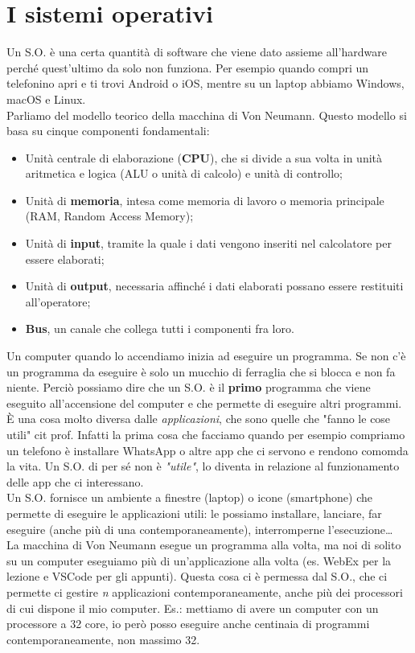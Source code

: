 \section{I sistemi operativi}
Un S.O. è una certa quantità di software che viene dato assieme all'hardware perché quest'ultimo da solo non funziona. Per esempio quando compri un telefonino apri e ti trovi Android o iOS, mentre su un laptop abbiamo Windows, macOS e Linux.\\ 
Parliamo del modello teorico della macchina di Von Neumann. Questo modello si basa su cinque componenti fondamentali:
\begin{itemize}
    \item Unità centrale di elaborazione (\textbf{CPU}), che si divide a sua volta in unità aritmetica e logica (ALU o unità di calcolo) e unità di controllo;
    \item Unità di \textbf{memoria}, intesa come memoria di lavoro o memoria principale (RAM, Random Access Memory);
    \item Unità di \textbf{input}, tramite la quale i dati vengono inseriti nel calcolatore per essere elaborati;
    \item Unità di \textbf{output}, necessaria affinché i dati elaborati possano essere restituiti all'operatore;
    \item \textbf{Bus}, un canale che collega tutti i componenti fra loro.
\end{itemize}
Un computer quando lo accendiamo inizia ad eseguire un programma. Se non c'è un programma da eseguire è solo un mucchio di ferraglia che si blocca e non fa niente. Perciò possiamo dire che un S.O. è il \textbf{primo} programma che viene eseguito all'accensione del computer e che permette di eseguire altri programmi. \`E una cosa molto diversa dalle \textit{applicazioni}, che sono quelle che "fanno le cose utili" cit prof. Infatti la prima cosa che facciamo quando per esempio compriamo un telefono è installare WhatsApp o altre app che ci servono e rendono comomda la vita. Un S.O. di per sé non è \textit{"utile"}, lo diventa in relazione al funzionamento delle app che ci interessano.\\
Un S.O. fornisce un ambiente a finestre (laptop) o icone (smartphone) che permette di eseguire le applicazioni utili: le possiamo installare, lanciare, far eseguire (anche più di una contemporaneamente), interromperne l'esecuzione\dots\\
La macchina di Von Neumann esegue un programma alla volta, ma noi di solito su un computer eseguiamo più di un'applicazione alla volta (es. WebEx per la lezione e VSCode per gli appunti). Questa cosa ci è permessa dal S.O., che ci permette ci gestire \textit{n} applicazioni contemporaneamente, anche più dei processori di cui dispone il mio computer. Es.: mettiamo di avere un computer con un processore a 32 core, io però posso eseguire anche centinaia di programmi contemporaneamente, non massimo 32.\\
